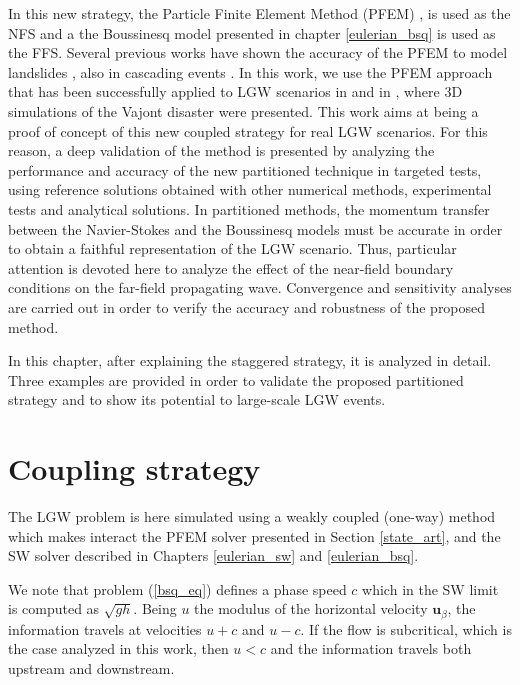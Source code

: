 In this new strategy, the Particle Finite Element Method (PFEM) \cite{idelsohn2004, onate2004, cremonesi2020state}, is used as the NFS and a the Boussinesq model presented in chapter \ref{eulerian_bsq} is used as the FFS. Several previous works have shown the accuracy of the PFEM to model landslides \cite{PFEMzhang1, PFEMzhangLandslide, zhang2021gpu}, also in cascading events \cite{CremonesiPFEM2, Salazar2012, CremonesiSlipLandslides, ZhangSubmarine}. In this work, we use the PFEM approach that has been successfully applied to LGW scenarios in \cite{mulligan2020} and in \cite{franci20203dA, franci20203dB}, where 3D simulations of the Vajont disaster were presented. This work aims at being a proof of concept of this new coupled strategy for real LGW scenarios. For this reason, a deep validation of the method is presented by analyzing the performance and accuracy of the new partitioned technique in targeted tests, using reference solutions obtained with other numerical methods, experimental tests and analytical solutions. In partitioned methods, the momentum transfer between the Navier-Stokes and the Boussinesq models must be accurate in order to obtain a faithful representation of the LGW scenario.
Thus, particular attention is devoted here to analyze the effect of the near-field boundary conditions on the far-field propagating wave. Convergence and sensitivity analyses are carried out in order to verify the accuracy and robustness of the proposed method.

In this chapter, after explaining the staggered strategy, it is analyzed in detail. Three examples are provided in order to validate the proposed partitioned strategy and to show its potential to large-scale LGW events.





\section{Coupling strategy}


The LGW problem is here simulated using a weakly coupled (one-way) method which makes interact the PFEM solver presented in Section \ref{state_art}, and the SW solver described in Chapters \ref{eulerian_sw} and \ref{eulerian_bsq}. 

We note that problem (\ref{bsq_eq}) defines a phase speed $c$ which in the SW limit is computed as $\sqrt{gh}$. Being $u$ the modulus of the horizontal velocity $\mathbf{u}_\beta$, the information travels at velocities $u+c$ and $u-c$. If the flow is subcritical, which is the case analyzed in this work, then $u<c$ and the information travels both upstream and downstream.

